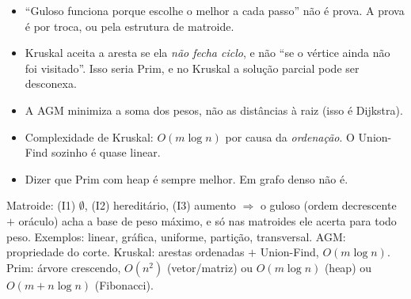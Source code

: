 \begin{cuidado}
\begin{itemize}
  \item ``Guloso funciona porque escolhe o melhor a cada passo'' não é prova. A prova é por troca, ou pela estrutura de matroide.
  \item Kruskal aceita a aresta se ela \emph{não fecha ciclo}, e não ``se o vértice ainda não foi visitado''. Isso seria Prim, e no Kruskal a solução parcial pode ser desconexa.
  \item A AGM minimiza a soma dos pesos, não as distâncias à raiz (isso é Dijkstra).
  \item Complexidade de Kruskal: $O(m\log n)$ por causa da \emph{ordenação}. O Union-Find sozinho é quase linear.
  \item Dizer que Prim com heap é sempre melhor. Em grafo denso não é.
\end{itemize}
\end{cuidado}

\begin{chave}
Matroide: (I1) $\emptyset$, (I2) hereditário, (I3) aumento $\Rightarrow$ o guloso (ordem decrescente $+$ oráculo) acha a base de peso máximo, e só nas matroides ele acerta para todo peso. Exemplos: linear, gráfica, uniforme, partição, transversal. AGM: propriedade do corte. Kruskal: arestas ordenadas $+$ Union-Find, $O(m\log n)$. Prim: árvore crescendo, $O(n^2)$ (vetor/matriz) ou $O(m\log n)$ (heap) ou $O(m+n\log n)$ (Fibonacci).
\end{chave}
